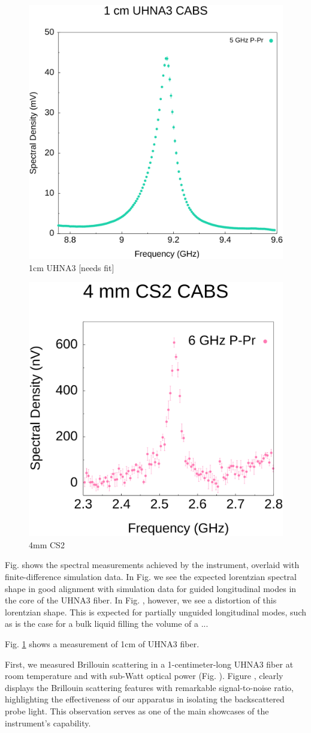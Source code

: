 \documentclass[
sn-nature,
twocolumn
]{sn-jnl}%
\begin{document}
\begin{figure}[t]
  \centering
  \includegraphics[width=.45\textwidth]{1cmUHNA3.pdf}
  \caption{1cm UHNA3 [needs fit]}\label{fig:1cmUHNA3}
\end{figure}

\begin{figure}[t]
  \centering
  \includegraphics[width=.45\textwidth]{4mmCS2.pdf}
  \caption{4mm CS2}\label{fig:4mmCS2}
\end{figure}

Fig. shows the spectral measurements achieved by the instrument, overlaid with finite-difference simulation data. In Fig. we see the expected lorentzian spectral shape in good alignment with simulation data for guided longitudinal modes in the core of the UHNA3 fiber. In Fig. , however, we see a distortion of this lorentzian shape. This is expected for partially unguided longitudinal modes, such as is the case for a bulk liquid filling the volume of a ...

Fig. \ref{fig:1cmUHNA3} shows a measurement of 1cm of UHNA3 fiber.

First, we measured Brillouin scattering in a 1-centimeter-long UHNA3 fiber at room temperature and with sub-Watt optical power (Fig. ). Figure , clearly displays the Brillouin scattering features with remarkable signal-to-noise ratio, highlighting the effectiveness of our apparatus in isolating the backscattered probe light. This observation serves as one of the main showcases of the instrument's capability.
\end{document}
